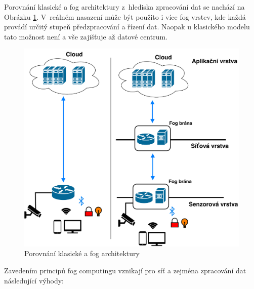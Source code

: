  Porovnání klasické a fog architektury z~hlediska zpracování dat se nachází
 na Obrázku \ref{obr.fog}. V~reálném nasazení může
 být použito i více fog vrstev, kde každá provádí určitý stupeň předzpracování a řízení
 dat. Naopak u klasického modelu tato možnost není a vše zajišťuje až datové centrum.
\begin{figure}[ht]
\begin{center}
\includegraphics[scale=0.45]{pictures/fog-arch}
\caption{Porovnání klasické a fog architektury}
\label{obr.fog}
\end{center}
\end{figure}
 Zavedením principů fog computingu vznikají pro síť a zejména zpracování dat následující výhody:
